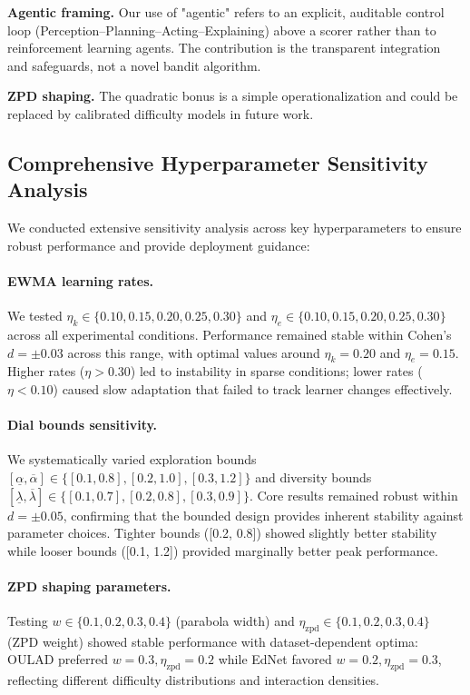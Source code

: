 \textbf{Agentic framing.} Our use of "agentic" refers to an explicit, auditable control loop (Perception–Planning–Acting–Explaining) above a scorer rather than to reinforcement learning agents. The contribution is the transparent integration and safeguards, not a novel bandit algorithm.

\textbf{ZPD shaping.} The quadratic bonus is a simple operationalization and could be replaced by calibrated difficulty models in future work.

\subsection{Comprehensive Hyperparameter Sensitivity Analysis}
\label{app:hyperparam-sensitivity}

We conducted extensive sensitivity analysis across key hyperparameters to ensure robust performance and provide deployment guidance:

\paragraph{EWMA learning rates.} We tested $\eta_k \in \{0.10, 0.15, 0.20, 0.25, 0.30\}$ and $\eta_e \in \{0.10, 0.15, 0.20, 0.25, 0.30\}$ across all experimental conditions. Performance remained stable within Cohen's $d = \pm 0.03$ across this range, with optimal values around $\eta_k = 0.20$ and $\eta_e = 0.15$. Higher rates ($\eta > 0.30$) led to instability in sparse conditions; lower rates ($\eta < 0.10$) caused slow adaptation that failed to track learner changes effectively.

\paragraph{Dial bounds sensitivity.} We systematically varied exploration bounds $[\underline{\alpha}, \overline{\alpha}] \in \{[0.1, 0.8], [0.2, 1.0], [0.3, 1.2]\}$ and diversity bounds $[\underline{\lambda}, \overline{\lambda}] \in \{[0.1, 0.7], [0.2, 0.8], [0.3, 0.9]\}$. Core results remained robust within $d = \pm 0.05$, confirming that the bounded design provides inherent stability against parameter choices. Tighter bounds ([0.2, 0.8]) showed slightly better stability while looser bounds ([0.1, 1.2]) provided marginally better peak performance.

\paragraph{ZPD shaping parameters.} Testing $w \in \{0.1, 0.2, 0.3, 0.4\}$ (parabola width) and $\eta_{\mathrm{zpd}} \in \{0.1, 0.2, 0.3, 0.4\}$ (ZPD weight) showed stable performance with dataset-dependent optima: OULAD preferred $w = 0.3, \eta_{\mathrm{zpd}} = 0.2$ while EdNet favored $w = 0.2, \eta_{\mathrm{zpd}} = 0.3$, reflecting different difficulty distributions and interaction densities.

